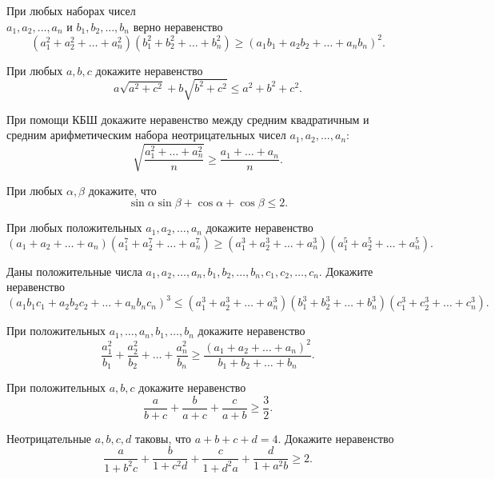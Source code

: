 \resetproblem \begingroup %
    \def\jeolmdate{26 октября 2018 г.}%
    \def\jeolmauthors{Доледенок~А.\,В., Орлов~О.\,П.}%
\jeolmheader \endgroup


 При любых наборах чисел \\ $a_1, a_2, \ldots, a_n$ и $b_1, b_2, \ldots, b_n$ верно неравенство
$$
(a_1^2 + a_2^2 + \ldots + a_n^2)(b_1^2 + b_2^2 + \ldots + b_n^2) \geqslant (a_1 b_1 + a_2 b_2 + \ldots + a_n b_n)^2.
$$

\begin{problems}

\item При любых $a, b, c$ докажите неравенство 
$$
a \sqrt{a^2 + c^2} + b\sqrt{b^2 + c^2} \leqslant a^2 + b^2 + c^2.
$$


\item
При помощи КБШ докажите неравенство между средним квадратичным и средним арифметическим набора неотрицательных чисел $a_1, a_2, \ldots, a_n$:
$$
\sqrt{\frac{a_1^2 + \ldots + a_n^2}n} \geqslant \frac{a_1 + \ldots + a_n}n.
$$

\item При любых $\alpha, \beta$ докажите, что
$$
\sin{\alpha} \sin{\beta} + \cos{\alpha} + \cos{\beta} \leqslant 2.
$$


\item При любых положительных $a_1, a_2, \ldots, a_n$ докажите неравенство
$$
(a_1 + a_2 + \ldots + a_n)(a_1^7 + a_2^7 + \ldots + a_n^7) \geqslant (a_1^3 + a_2^3 + \ldots + a_n^3)(a_1^5 + a_2^5 + \ldots + a_n^5).
$$

\item Даны положительные числа $a_1, a_2, \ldots, a_n, b_1, b_2, \ldots, b_n, c_1, c_2, \ldots, c_n$. Докажите неравенство
$$
(a_1 b_1 c_1 + a_2 b_2 c_2 + \ldots + a_n b_n c_n)^3 \leqslant (a_1^3 + a_2^3 + \ldots + a_n^3)(b_1^3 + b_2^3 + \ldots + b_n^3)(c_1^3 + c_2^3 + \ldots + c_n^3).
$$


\item При положительных $a_1, \ldots, a_n, b_1, \ldots, b_n$ докажите неравенство
$$
\frac{a_1^2}{b_1} + \frac{a_2^2}{b_2} + \ldots + \frac{a_n^2}{b_n} \geqslant \frac{(a_1 + a_2 + \ldots + a_n)^2}{b_1 + b_2 + \ldots + b_n}.
$$

\item При положительных $a, b, c$ докажите неравенство
$$
\frac{a}{b + c} + \frac{b}{a + c} + \frac{c}{a + b} \geqslant \frac32.
$$


\item 
Неотрицательные $a, b, c, d$ таковы, что $a + b + c + d = 4$. Докажите неравенство
$$
\frac{a}{1 + b^2 c} + \frac{b}{1 + c^2 d} + \frac{c}{1 + d^2 a} + \frac{d}{1 + a^2 b} \geqslant 2.
$$

\end{problems}

